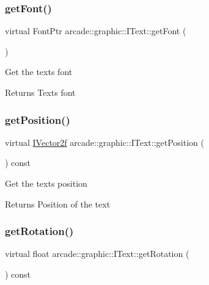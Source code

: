 \subsubsection{\texorpdfstring{getFont()}{getFont()}}
{\footnotesize\ttfamily virtual Font\+Ptr arcade\+::graphic\+::\+I\+Text\+::get\+Font (\begin{DoxyParamCaption}{ }\end{DoxyParamCaption})\hspace{0.3cm}{\ttfamily [pure virtual]}}

Get the text\textquotesingle{}s font \begin{DoxyReturn}{Returns}
Text\textquotesingle{}s font 
\end{DoxyReturn}
\mbox{\label{classarcade_1_1graphic_1_1_i_text_a78de4816a5a2f5d8ea85ef30bf5e9a47}} 
\subsubsection{\texorpdfstring{getPosition()}{getPosition()}}
{\footnotesize\ttfamily virtual \mbox{\hyperlink{classarcade_1_1graphic_1_1_i_vector2f}{I\+Vector2f}} arcade\+::graphic\+::\+I\+Text\+::get\+Position (\begin{DoxyParamCaption}{ }\end{DoxyParamCaption}) const\hspace{0.3cm}{\ttfamily [pure virtual]}}

Get the text\textquotesingle{}s position \begin{DoxyReturn}{Returns}
Position of the text 
\end{DoxyReturn}
\mbox{\label{classarcade_1_1graphic_1_1_i_text_a814f9412043c8436ffa4614990d4c653}} 
\subsubsection{\texorpdfstring{getRotation()}{getRotation()}}
{\footnotesize\ttfamily virtual float arcade\+::graphic\+::\+I\+Text\+::get\+Rotation (\begin{DoxyParamCaption}{ }\end{DoxyParamCaption}) const\hspace{0.3cm}{\ttfamily [pure virtual]}}

